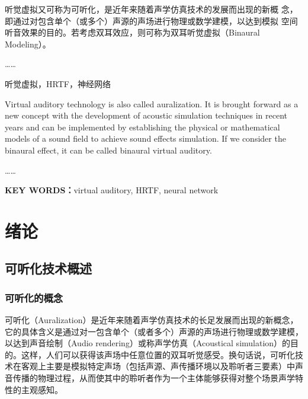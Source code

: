 \documentclass{nwputhesis}
\begin{document}
\maketitle

\newpage
\makeabstract

听觉虚拟又可称为可听化，是近年来随着声学仿真技术的发展而出现的新概
念，即通过对包含单个（或多个）声源的声场进行物理或数学建模，以达到模拟
空间听音效果的目的。若考虑双耳效应，则可称为双耳听觉虚拟（Binaural
Modeling）。

……

听觉虚拟，HRTF，神经网络

\makeEnabstract

Virtual auditory technology is also called auralization. It is brought forward as a new concept with the development of acoustic simulation techniques in recent years and can be implemented by establishing the physical or mathematical models of a sound field to achieve sound effects simulation. If we consider the binaural effect, it can be called binaural virtual auditory.

……

\noindent \textbf{ KEY WORDS：}virtual auditory, HRTF, neural network

\makecontent

\maketext

\section{绪论}
\subsection{可听化技术概述}
\subsubsection{可听化的概念}

可听化（Auralization）是近年来随着声学仿真技术的长足发展而出现的新概念，它的具体含义是通过对一包含单个（或者多个）声源的声场进行物理或数学建模，以达到声音绘制（Audio rendering）或称声学仿真（Acoustical simulation）的目的。这样，人们可以获得该声场中任意位置的双耳听觉感受。换句话说，可听化技术在客观上主要是模拟特定声场（包括声源、声传播环境以及聆听者三要素）中声音传播的物理过程，从而使其中的聆听者作为一个主体能够获得对整个场景声学特性的主观感知。
\end{document}
